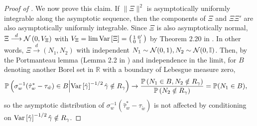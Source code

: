 \documentclass[english,11pt]{article}
\theoremstyle{plain}
\theoremstyle{plain}
\theoremstyle{plain}
\theoremstyle{plain}
\let\ref\Cref
\begin{document}
\begin{proof}[Proof of \ref{prop:pretesting}]
We now prove this claim. If $\|\Xi\|^{2}$ is asymptotically uniformly
integrable along the asymptotic sequence, then the components of $\Xi$
and $\Xi\Xi'$ are also asymptotically uniformly integrable. Since
$\Xi$ is also asymptotically normal, $\Xi\stackrel{d}{\longrightarrow}\mathcal{N}\left(0,V_{\Xi}\right)$
with $V_{\Xi}=\lim\mathrm{Var}\left[\Xi\right]=\begin{psmallmatrix}1 & 0' \\ 0 & \mathbb{I} \end{psmallmatrix}$
by Theorem 2.20 in \textcite{van2000asymptotic}. In other words,
$\Xi\stackrel{d}{\longrightarrow}(N_{1},N_{2})$ with independent
$N_{1}\sim\mathcal{N}(0,1),N_{2}\sim\mathcal{N}(0,\mathbb{I})$. Then, by the Portmanteau lemma
(Lemma 2.2 in \textcite{van2000asymptotic}) and independence in the
limit, for $B$ denoting another Borel set in $\mathbb{R}$ with a
boundary of Lebesgue measure zero,
\begin{align*}
\mathbb{P}\left(\sigma_{w}^{-1}(\hat{\tau}_{w}^{*}-\tau_{\tilde{w}})\in B\middle|\mathrm{Var}\left[\hat{\gamma}\right]^{-1/2}\hat{\gamma}\notin R_{\gamma}\right) & \rightarrow\text{\ensuremath{\frac{\mathbb{P}\left(N_{1}\in B,N_{2}\notin R_{\gamma}\right)}{\mathbb{P}\left(N_{2}\notin R_{\gamma}\right)}}}=\mathbb{P}(N_{1}\in B),
\end{align*}
so the asymptotic distribution of $\sigma_{w}^{-1}(\hat{\tau}_{w}^{*}-\tau_{\tilde{w}})$
is not affected by conditioning on $\mathrm{Var}\left[\hat{\gamma}\right]^{-1/2}\hat{\gamma}\notin R_{\gamma}$.
\end{proof}
\end{document}
